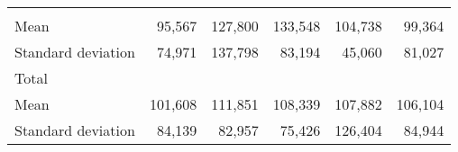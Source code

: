\begin{tabular}{llllll}
  \multicolumn{1}{|r}{} &
  \multicolumn{1}{r}{} &
  \multicolumn{1}{r}{} &
  \multicolumn{1}{r}{} &
  \multicolumn{1}{r}{} \\
\multicolumn{1}{l}{\hspace{4em}Mean} &
  \multicolumn{1}{|r}{95,567} &
  \multicolumn{1}{r}{127,800} &
  \multicolumn{1}{r}{133,548} &
  \multicolumn{1}{r}{104,738} &
  \multicolumn{1}{r}{99,364} \\
\multicolumn{1}{l}{\hspace{4em}Standard deviation} &
  \multicolumn{1}{|r}{74,971} &
  \multicolumn{1}{r}{137,798} &
  \multicolumn{1}{r}{83,194} &
  \multicolumn{1}{r}{45,060} &
  \multicolumn{1}{r}{81,027} \\
\multicolumn{1}{l}{\hspace{3em}Total} &
  \multicolumn{1}{|r}{} &
  \multicolumn{1}{r}{} &
  \multicolumn{1}{r}{} &
  \multicolumn{1}{r}{} &
  \multicolumn{1}{r}{} \\
\multicolumn{1}{l}{\hspace{4em}Mean} &
  \multicolumn{1}{|r}{101,608} &
  \multicolumn{1}{r}{111,851} &
  \multicolumn{1}{r}{108,339} &
  \multicolumn{1}{r}{107,882} &
  \multicolumn{1}{r}{106,104} \\
\multicolumn{1}{l}{\hspace{4em}Standard deviation} &
  \multicolumn{1}{|r}{84,139} &
  \multicolumn{1}{r}{82,957} &
  \multicolumn{1}{r}{75,426} &
  \multicolumn{1}{r}{126,404} &
  \multicolumn{1}{r}{84,944} \\
\cline{1-6}
\end{tabular}

